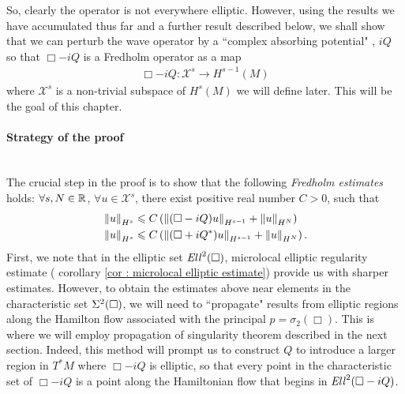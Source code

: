 \documentclass[12pt]{article}
\begin{document}
So, clearly the operator is not everywhere elliptic. However, using the results we have accumulated thus far and a further result described below, we shall show that we can perturb the wave operator by a ``complex absorbing potential" \cite{Vasy2015-oo,Muga2004-ax}, $iQ$ so that $\Box - iQ$ is a Fredholm operator as a map 
\begin{align*}
\Box - iQ : \mathcal{X}^s \to H^{s -1}(M)
\end{align*}
where $\mathcal{X}^s$ is a non-trivial subspace of $H^s(M)$ we will define later. This will be the goal of this chapter. 



\paragraph{Strategy of the proof} \hfill \\
The crucial step in the proof is to show that the following \textit{Fredholm estimates} holds: $\forall s, N \in \R$, $\forall u \in \mathcal{X}^s$, there exist positive real number $C > 0$, such that
\begin{align*}
&\norm[u]_{H^s} \leq C \brac{ \norm[(\Box - i Q)u]_{H^{s - 1}} + \norm[u]_{H^N}} \\
&\norm[u]_{H^s} \leq C \brac{ \norm[(\Box + i Q^*)u]_{H^{s - 1}} + \norm[u]_{H^N}}. 
\end{align*}
First, we note that in the elliptic set $\Ell^2(\Box)$, microlocal elliptic regularity estimate ( corollary \ref{cor : microlocal elliptic estimate}) provide us with sharper estimates. However, to obtain the estimates above near elements in the characteristic set $\Char^2(\Box)$, we will need to ``propagate" results from elliptic regions along the Hamilton flow associated with the principal $p = \sigma_2(\Box)$. This is where we will employ propagation of singularity theorem described in the next section. Indeed, this method will prompt us to construct $Q$ to introduce a larger region in $T^*M$ where $\Box - iQ$ is elliptic, so that every point in the characteristic set of $\Box - iQ$ is a point along the Hamiltonian flow that begins in $\Ell^2(\Box - iQ)$. 
\end{document}
